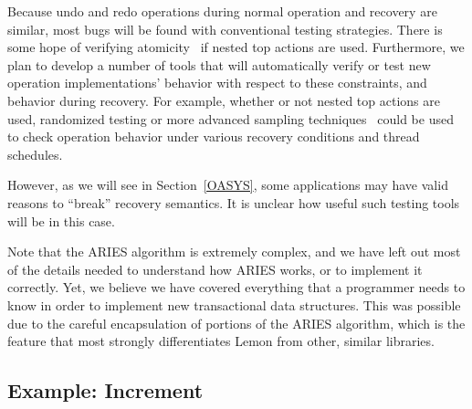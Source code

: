 \documentclass[letterpaper,twocolumn,english]{article}
\newcommand{\yad}{Lemon\xspace}
\begin{document}
Because undo and redo operations during normal operation and recovery
are similar, most bugs will be found with conventional testing
strategies.  There is some hope of verifying atomicity~\cite{StaticAnalysisReference} if
nested top actions are used.  Furthermore, we plan to develop a
number of tools that will automatically verify or test new operation
implementations' behavior with respect to these constraints, and
behavior during recovery.  For example, whether or not nested top actions are
used, randomized testing or more advanced sampling techniques~\cite{OSDIFSModelChecker}
could be used to check operation behavior under various recovery
conditions and thread schedules.

However, as we will see in Section~\ref{OASYS}, some applications may
have valid reasons to ``break'' recovery semantics.  It is unclear how
useful such testing tools will be in this case.

Note that the ARIES algorithm is extremely complex, and we have left
out most of the details needed to understand how ARIES works, or to 
implement it correctly.
Yet, we believe we have covered everything that a programmer needs
 to know in order to implement new transactional data structures. 
This was possible due to the careful encapsulation
of portions of the ARIES algorithm, which is the feature that
most strongly differentiates \yad from other, similar libraries.


\subsection{Example: Increment}
\end{document}
